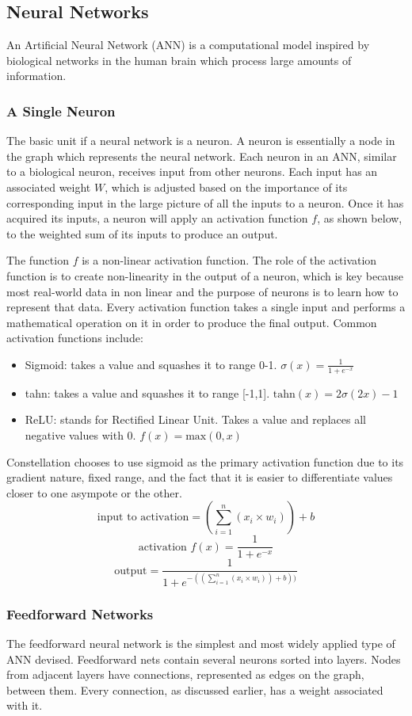 \subsection{Neural Networks}
An Artificial Neural Network (ANN) is a computational model inspired by biological networks in the human brain which process large amounts of information.
\subsubsection{A Single Neuron}
The basic unit if a neural network is a neuron. A neuron is essentially a node in the graph which represents the neural network. Each neuron in an ANN, similar to a biological neuron, receives input from other neurons. Each input has an associated weight $W$, which is adjusted based on the importance of its corresponding input in the large picture of all the inputs to a neuron. Once it has acquired its inputs, a neuron will apply an activation function $f$, as shown below, to the weighted sum of its inputs to produce an output.


The function $f$ is a non-linear activation function. The role of the activation function is to create non-linearity in the output of a neuron, which is key because most real-world data in non linear and the purpose of neurons is to learn how to represent that data. Every activation function takes a single input and performs a mathematical operation on it in order to produce the final output. Common activation functions include:
\begin{itemize}
    \item Sigmoid: takes a value and squashes it to range 0-1. $\sigma(x) = \frac{1}{1+e^{-x}}$
    \item tahn: takes a value and squashes it to range [-1,1]. $\text{tahn}(x)=2\sigma(2x)-1$
    \item ReLU: stands for Rectified Linear Unit. Takes a value and replaces all negative values with 0. $f(x)=\text{max}(0,x)$
\end{itemize}

Constellation chooses to use sigmoid as the primary activation function due to its gradient nature, fixed range, and the fact that it is easier to differentiate values closer to one asympote or the other.
$$\text{input to activation}= (\sum\limits_{i=1}^n (x_i\times w_i))+b$$
$$\text{activation }f(x) = \frac{1}{1+e^{-x}}$$
$$\text{output}=\frac{1}{1+e^{-((\sum\limits_{i=1}^n (x_i\times w_i))+b))}}$$
\subsubsection{Feedforward Networks}
The feedforward neural network is the simplest and most widely applied type of ANN devised. Feedforward nets contain several neurons sorted into layers. Nodes from adjacent layers have connections, represented as edges on the graph, between them. Every connection, as discussed earlier, has a weight associated with it. \\


